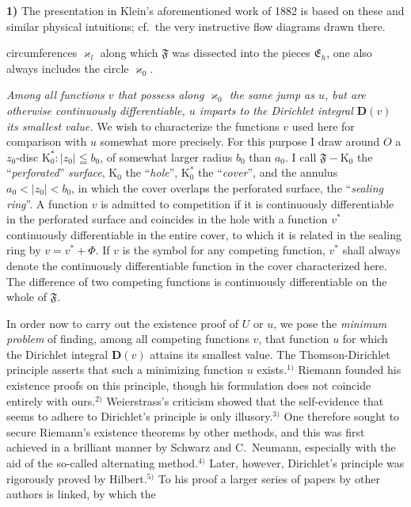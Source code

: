 \documentclass{article}
\begin{document}
\textbf{1)} The presentation in Klein's aforementioned work of 1882 is based on these and similar physical intuitions; cf.\ the very instructive flow diagrams drawn there.

circumferences $\varkappa_l$ along which $\mathfrak{F}$ was dissected into the pieces $\mathfrak{E}_h$, one also always includes the circle $\varkappa_0$.

\emph{Among all functions $v$ that possess along $\varkappa_0$ the same jump as $u$, but are otherwise continuously differentiable, $u$ imparts to the Dirichlet integral $\mathbf{D}(v)$ its smallest value.} We wish to characterize the functions $v$ used here for comparison with $u$ somewhat more precisely. For this purpose I draw around $O$ a $z_0$-disc $\mathrm{K}_0^*\colon |z_0| \leqq b_0$, of somewhat larger radius $b_0$ than $a_0$. I call $\mathfrak{F} - \mathrm{K}_0$ the ``\emph{perforated}'' \emph{surface}, $\mathrm{K}_0$ the ``\emph{hole}'', $\mathrm{K}_0^*$ the ``\emph{cover}'', and the annulus $a_0 < |z_0| < b_0$, in which the cover overlaps the perforated surface, the ``\emph{sealing ring}''. A function $v$ is admitted to competition if it is continuously differentiable in the perforated surface and coincides in the hole with a function $v^*$ continuously differentiable in the entire cover, to which it is related in the sealing ring by $v = v^* + \Phi$. If $v$ is the symbol for any competing function, $v^*$ shall always denote the continuously differentiable function in the cover characterized here. The difference of two competing functions is continuously differentiable on the whole of $\mathfrak{F}$.

In order now to carry out the existence proof of $U$ or $u$, we pose the \emph{minimum problem} of finding, among all competing functions $v$, that function $u$ for which the Dirichlet integral $\mathbf{D}(v)$ attains its smallest value. The Thomson-Dirichlet principle asserts that such a minimizing function $u$ exists.${}^{1)}$ Riemann founded his existence proofs on this principle, though his formulation does not coincide entirely with ours.${}^{2)}$ Weierstrass's criticism showed that the self-evidence that seems to adhere to Dirichlet's principle is only illusory.${}^{3)}$ One therefore sought to secure Riemann's existence theorems by other methods, and this was first achieved in a brilliant manner by Schwarz and C.~Neumann, especially with the aid of the so-called alternating method.${}^{4)}$ Later, however, Dirichlet's principle was rigorously proved by Hilbert.${}^{5)}$ To his proof a larger series of papers by other authors is linked, by which the
\end{document}
